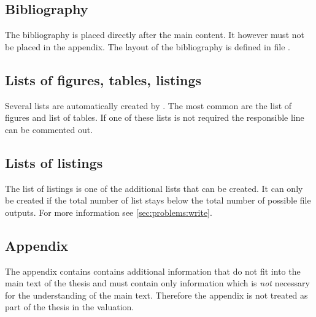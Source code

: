 
\subsection{Bibliography}
The bibliography is placed directly after the main content. It however must 
not be placed in the appendix. The layout of the bibliography is defined in 
file .
%

\subsection{Lists of figures, tables, listings}
Several lists are automatically created by \latex. The most common are the list of figures and list of tables. If one of these lists is not required the responsible line can be commented out. 
%

\subsection{Lists of listings}
The list of listings is one of the additional lists that can be created. 
It can only be created if the total number of list stays below the total number of possible file outputs. For more information see \cref{sec:problems:write}.


\subsection{Appendix}
The appendix contains contains additional information that do not fit into the main text of the thesis and must contain only information which is \emph{not} necessary for the understanding of the main text. Therefore the appendix is not treated as part of the thesis in the valuation.

